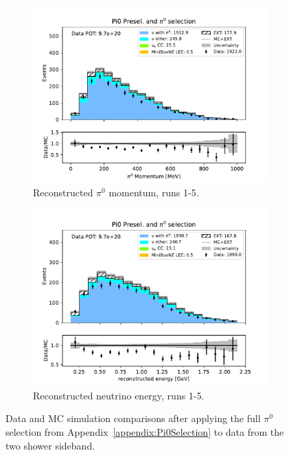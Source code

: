 \begin{figure}[H]
    \begin{subfigure}{0.33\linewidth}
        \includegraphics[width=\linewidth]{technote/Sidebands/Figures/TwoShowerSideband/two_shr_sideband_pi0momentum_run1234b4c4d_PI0_PI0.pdf}
        \caption{Reconstructed $\pi^0$ momentum, runs 1-5.}
    \end{subfigure}%
    \begin{subfigure}{0.33\linewidth}
        \includegraphics[width=\linewidth]{technote/Sidebands/Figures/TwoShowerSideband/two_shr_sideband_reco_e_run1234b4c4d_PI0_PI0.pdf}
        \caption{Reconstructed neutrino energy, runs 1-5.}
    \end{subfigure}
    \caption{Data and MC simulation comparisons after applying the full $\pi^0$ selection from Appendix~\ref{appendix:Pi0Selection} to data from the two shower sideband.}
    \label{fig:Pi0Sideband}
\end{figure}